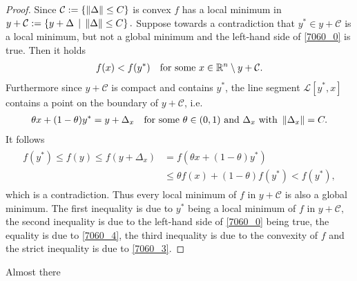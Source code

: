 \begin{proof}
  Since 
  $\mathcal{C}:=\left\{ \left\lVert\Delta\right\rVert\le C \right\}$
  is convex
  $f$ has a local minimum in 
  $
    y + \mathcal{C}
    :=
    \left\{ 
      y + \Delta \,
      \mid \,
      \left\lVert\Delta\right\rVert\le C
    \right\}
    .
  $
  Suppose towards a contradiction that
  $
    y^* \in 
            y + \mathcal{C}
  $
  is a local minimum, but not a global minimum 
  and
  the left-hand side of 
  \eqref{7060_0} is true.
  Then it holds
  \begin{gather}
    \label{7060_3}
    f(x) < f(y^*)
    \quad
    \text{for some}\ 
    x 
    \in 
    \R^n 
    \setminus 
      y + \mathcal{C}
    .
  \end{gather}
  Furthermore since $y + \mathcal{C}$ is compact and contains $y^*$,
  the line segment $\mathcal{L}[y^*,x]$ contains a point on the boundary of 
  $y + \mathcal{C}$, i.e.
  \begin{gather}
    \label{7060_4}
    \theta x + (1 - \theta) y^* = y + \Delta_x
    \quad
    \text{for some}\ 
    \theta \in (0,1)\ 
    \text{and}\ 
    \Delta_x \ 
    \text{with}\ 
    \norm{\Delta_x}=C
    .
  \end{gather}
    It follows
    \begin{align}
      \label{7060_5}
      \begin{split}
      f(y^*)
      \le
      f(y)
      \le
      f(y + \Delta_x)
      &=
      f(
        \theta x + (1 - \theta) y^*
      )
      \\
      &\le
      \theta f(x)
      + 
      (1 - \theta)
      f(y^*)
      <
      f(y^*)
      ,
      \end{split}
    \end{align}
    which is a contradiction.
    Thus every local minimum of $f$ in $y + \mathcal{C}$ is also a global minimum.
    The first inequality is due to
    $y^*$ being a local minimum of $f$ in
    $
      y + \mathcal{C},
    $
    the second inequality is due to the left-hand side of 
    \eqref{7060_0} being true,
    the equality is due to \eqref{7060_4},
    the third inequality is due to the convexity of $f$
    and the strict inequality is due to \eqref{7060_3}.
\end{proof}


\begin{takeaways}
  Almost there 
  \todo[color=purple!40,inline]{Add more meaning.}
\end{takeaways}
